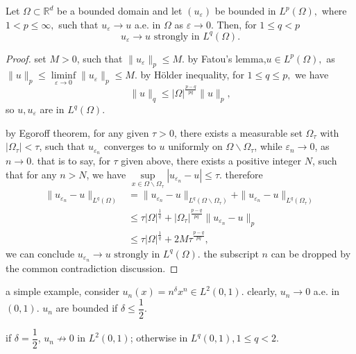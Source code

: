 \begin{lemma}
	Let $\Omega \subset \mathbb{R}^{d}$ be a bounded domain and let $\left(u_{\varepsilon}\right)$ be bounded in $L^{p}(\Omega),$ where $1<p \leq \infty,$ such that $u_{\varepsilon} \rightarrow u$ a.e. in $\Omega$ as $\varepsilon \rightarrow 0 .$ Then, for $1 \leq q<p$
	$$
	u_{\varepsilon} \rightarrow u \text { strongly in } L^{q}(\Omega).
	$$
\end{lemma}
\begin{proof}
	set $M > 0$, such that $\|u_\varepsilon\|_p \leqslant M$. by Fatou's lemma,$u\in L^p(\Omega),$ as 
	\(\|u\|_p \leqslant \liminf\limits_{\varepsilon\rightarrow 0}\|u_\varepsilon\|_p \leqslant M\).
	by H\"{o}lder inequality, for $1 \leqslant q\leqslant p,$ we have \[\|u\|_q \leqslant |\Omega|^{\frac{p-q}{pq}} \|u\|_p,\]
	so $u,u_\varepsilon$ are in $L^q(\Omega)$.
	
	by Egoroff theorem, for any given $\tau > 0$, there exists a measurable set $\Omega_\tau$ with $|\Omega_\tau| < \tau$, such that $u_{\varepsilon_n}$ converges to $u$ uniformly on $\Omega\backslash \Omega_\tau$, while $\varepsilon_n \rightarrow 0$, as $n \rightarrow 0.$
	that is to say, for $\tau$ given above, there exists a positive integer $N$, such that for any $n > N$, we have $\sup\limits_{x\in\Omega\backslash\Omega_\tau}|u_{\varepsilon_n} - u| \leqslant \tau$. therefore
	\begin{equation*}
		\begin{split}
			\|u_{\varepsilon_n} - u\|_{L^q(\Omega)} &= \|u_{\varepsilon_n} - u\|_{L^q(\Omega\backslash\Omega_\tau)} + \|u_{\varepsilon_n} - u\|_{L^q(\Omega_\tau)}\\ 
			& \leqslant \tau|\Omega|^{\frac{1}{q}} + |\Omega_\tau|^{\frac{p-q}{pq}}\|u_{\varepsilon_n } - u\|_p\\
			& \leqslant \tau|\Omega|^{\frac{1}{q}} + 2M\tau^{\frac{p-q}{pq}},
		\end{split}
	\end{equation*}
we can conclude $u_{\varepsilon_n} \rightarrow u \text { strongly in } L^{q}(\Omega)$. the subscript $n$ can be dropped by the common contradiction discussion.
\end{proof}

a simple example, consider $u_n(x)=n^\delta x^n\in L^2(0,1)$. clearly, $u_n\rightarrow0$ a.e. in $(0,1)$.
$u_n$ are bounded if $\delta \leqslant \dfrac{1}{2}.$

if $\delta = \dfrac{1}{2}$, $u_n\not\rightarrow0$ in $L^2(0,1)$; otherwise in $L^q(0,1),1\leqslant q < 2$.

